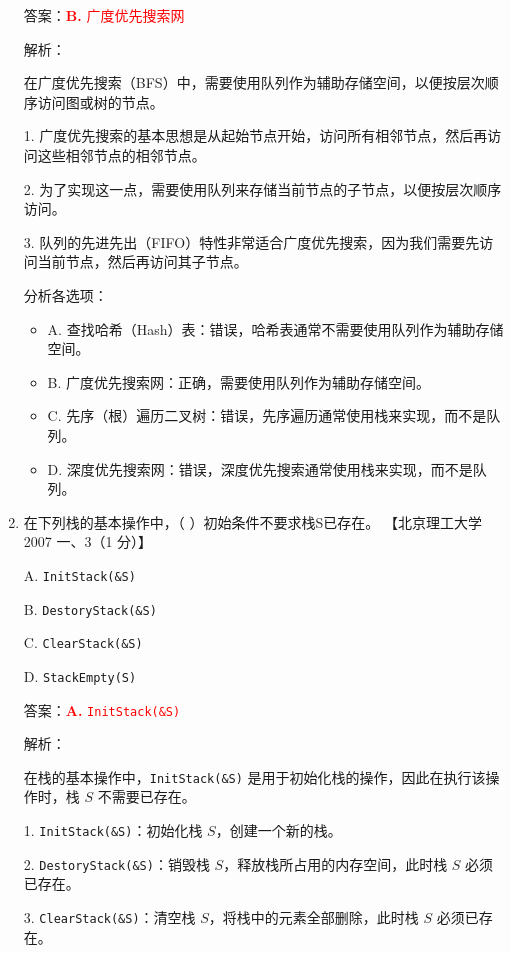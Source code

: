 \documentclass[lang=cn,newtx,10pt,scheme=chinese]{../../../elegantbook}
\begin{document}
\begin{enumerate}
    答案：\textcolor{red}{\textbf{B.} 广度优先搜索网}

    解析：

    在广度优先搜索（BFS）中，需要使用队列作为辅助存储空间，以便按层次顺序访问图或树的节点。

    1. 广度优先搜索的基本思想是从起始节点开始，访问所有相邻节点，然后再访问这些相邻节点的相邻节点。

    2. 为了实现这一点，需要使用队列来存储当前节点的子节点，以便按层次顺序访问。

    3. 队列的先进先出（FIFO）特性非常适合广度优先搜索，因为我们需要先访问当前节点，然后再访问其子节点。

    分析各选项：
    \begin{itemize}
        \item A. 查找哈希（Hash）表：错误，哈希表通常不需要使用队列作为辅助存储空间。
        
        \item B. 广度优先搜索网：正确，需要使用队列作为辅助存储空间。
        
        \item C. 先序（根）遍历二叉树：错误，先序遍历通常使用栈来实现，而不是队列。
        
        \item D. 深度优先搜索网：错误，深度优先搜索通常使用栈来实现，而不是队列。
    \end{itemize}

    \item 在下列栈的基本操作中，（ ）初始条件不要求栈S已存在。  
    【北京理工大学 2007 一、3（1 分）】  

    A. \texttt{InitStack(\&S)}  

    B. \texttt{DestoryStack(\&S)}  

    C. \texttt{ClearStack(\&S)}  

    D. \texttt{StackEmpty(S)}  

    答案：\textcolor{red}{\textbf{A.} \texttt{InitStack(\&S)}}

    解析：

    在栈的基本操作中，\texttt{InitStack(\&S)} 是用于初始化栈的操作，因此在执行该操作时，栈 $S$ 不需要已存在。

    1. \texttt{InitStack(\&S)}：初始化栈 $S$，创建一个新的栈。

    2. \texttt{DestoryStack(\&S)}：销毁栈 $S$，释放栈所占用的内存空间，此时栈 $S$ 必须已存在。

    3. \texttt{ClearStack(\&S)}：清空栈 $S$，将栈中的元素全部删除，此时栈 $S$ 必须已存在。


\end{enumerate}
\end{document}
